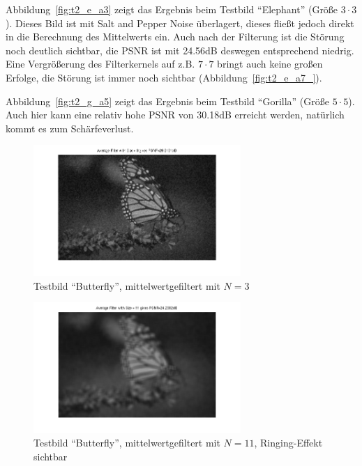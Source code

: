 Abbildung~\ref{fig:t2_e_a3} zeigt das Ergebnis beim Testbild ``Elephant'' (Größe $3 \cdot 3$). Dieses Bild ist mit Salt and Pepper Noise überlagert, dieses fließt jedoch direkt in die Berechnung des Mittelwerts ein. Auch nach der Filterung ist die Störung noch deutlich sichtbar, die PSNR ist mit 24.56dB deswegen entsprechend niedrig. Eine Vergrößerung des Filterkernels auf z.B. $7 \cdot 7$ bringt auch keine großen Erfolge, die Störung ist immer noch sichtbar (Abbildung~\ref{fig:t2_e_a7_}).

Abbildung~\ref{fig:t2_g_a5} zeigt das Ergebnis beim Testbild ``Gorilla'' (Größe $5 \cdot 5$). Auch hier kann eine relativ hohe PSNR von 30.18dB erreicht werden, natürlich kommt es zum Schärfeverlust.

\smallskip

\begin{figure}[htb]
 \centering
 \includegraphics[width=0.7\textwidth]{../images_out/t2_b_a3.png}
 \caption{Testbild ``Butterfly'', mittelwertgefiltert mit $N=3$}
 \label{fig:t2_b_a3}
\end{figure}

\begin{figure}[htb]
 \centering
 \includegraphics[width=0.7\textwidth]{../images_out/t2_b_a11_ring.png}
 \caption{Testbild ``Butterfly'', mittelwertgefiltert mit $N=11$, Ringing-Effekt sichtbar}
 \label{fig:t2_b_a11_ring}
\end{figure}


